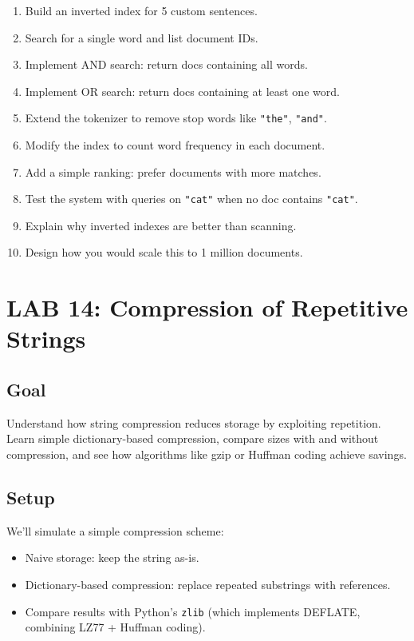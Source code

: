\documentclass[
  letterpaper,
  DIV=11,
  numbers=noendperiod]{scrreprt}
\providecommand{\tightlist}{%
  \setlength{\itemsep}{0pt}\setlength{\parskip}{0pt}}
\begin{document}
\begin{enumerate}
\def\labelenumi{\arabic{enumi}.}
\tightlist
\item
  Build an inverted index for 5 custom sentences.
\item
  Search for a single word and list document IDs.
\item
  Implement AND search: return docs containing all words.
\item
  Implement OR search: return docs containing at least one word.
\item
  Extend the tokenizer to remove stop words like \texttt{"the"},
  \texttt{"and"}.
\item
  Modify the index to count word frequency in each document.
\item
  Add a simple ranking: prefer documents with more matches.
\item
  Test the system with queries on \texttt{"cat"} when no doc contains
  \texttt{"cat"}.
\item
  Explain why inverted indexes are better than scanning.
\item
  Design how you would scale this to 1 million documents.
\end{enumerate}

\section{LAB 14: Compression of Repetitive
Strings}\label{lab-14-compression-of-repetitive-strings}

\subsection{Goal}\label{goal-13}

Understand how string compression reduces storage by exploiting
repetition. Learn simple dictionary-based compression, compare sizes
with and without compression, and see how algorithms like gzip or
Huffman coding achieve savings.

\subsection{Setup}\label{setup-13}

We'll simulate a simple compression scheme:

\begin{itemize}
\tightlist
\item
  Naive storage: keep the string as-is.
\item
  Dictionary-based compression: replace repeated substrings with
  references.
\item
  Compare results with Python's \texttt{zlib} (which implements DEFLATE,
  combining LZ77 + Huffman coding).
\end{itemize}
\end{document}
